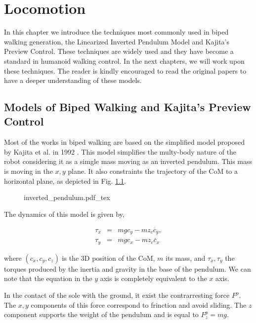
\chapter{Locomotion} 
\label{Chap:Locomotion-Control}

In this chapter we introduce the techniques most commonly used in biped walking generation, the Linearized Inverted Pendulum Model and Kajita's Preview Control. These techniques are widely used and they have become a standard in humanoid walking control. In the next chapters, we will work upon these techniques. The reader is kindly encouraged to read the original papers to have a deeper understanding of these models.


\section{Models of Biped Walking and Kajita's Preview Control}
Most of the works in biped walking are based on the simplified model proposed by Kajita et al. in 1992 \citep{Kajita1992}. This model simplifies the multy-body nature of the robot considering it as a simgle mass moving as an inverted pendulum. This mass is moving in the $x,y$ plane. It also constraints the trajectory of the CoM to a horizontal plane, as depicted in Fig. \ref{Fig:Inverted-Pendulum}.

\begin{figure}
  \centering
      {\def\svgwidth{1.0\columnwidth}
        
                   {inverted_pendulum.pdf_tex}}
      \caption[]{}
      \label{Fig:Inverted-Pendulum}
\end{figure}

The dynamics of this model is given by,

\begin{eqnarray}
\label{Eq:LIPM_dynamics}
\tau_x &=& mgc_y - mz_c \ddot{c_y}, \\
\tau_y &=& mgc_x - mz_c \ddot{c_x}
\end{eqnarray}

where $(c_x, c_y, c_z)$ is the 3D position of the CoM, $m$ its mass, and $\tau_x, \tau_y$ the torques produced by the inertia and gravity in the base of the pendulum. We can note that the equation in the $y$ axis is completely equivalent to the $x$ axis.

In the contact of the sole with the ground, it exist the contrarresting force $F^p$. The $x,y$ components of this force correspond to frinction and avoid sliding. The $z$ component supports the weight of the pendulum and is equal to $F^p_z = mg$.

